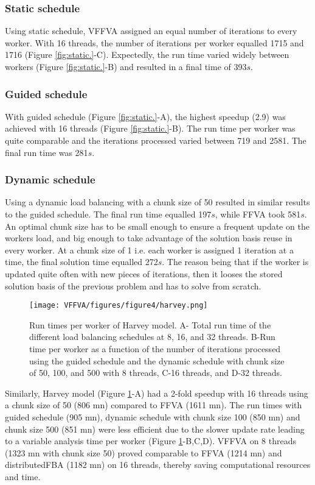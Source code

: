 \subsubsection{Static schedule}
Using static schedule, VFFVA assigned an equal number of iterations to every worker. With 16 threads, the number of iterations per worker equalled 1715 and 1716 (Figure \ref{fig:static.}-C). Expectedly, the run time varied widely between workers (Figure \ref{fig:static.}-B) and resulted in a final time of 393$s$.
\subsubsection{Guided schedule}
With guided schedule (Figure \ref{fig:static.}-A), the highest speedup (2.9) was achieved with 16 threads (Figure \ref{fig:static.}-B). The run time per worker was quite comparable and the iterations processed varied between 719 and 2581. The final run time was 281$s$.
\subsubsection{Dynamic schedule}
Using a dynamic load balancing with a chunk size of 50 resulted in similar results to the guided schedule. The final run time equalled 197$s$, while FFVA took 581$s$. An optimal chunk size has to be small enough to ensure a frequent update on the workers load, and big enough to take advantage of the solution basis reuse in every worker. At a chunk size of 1 i.e. each worker is assigned 1 iteration at a time, the final solution time equalled 272$s$. The reason being that if the worker is updated quite often with new pieces of iterations, then it looses the stored solution basis of the previous problem and has to solve from scratch.\\ 
\begin{figure}[!htp]
\centering
\texttt{[image: VFFVA/figures/figure4/harvey.png]}
\caption[Run times per worker of Harvey model.]{Run times per worker of Harvey model. A- Total run time of the different load balancing schedules at 8, 16, and 32 threads. B-Run time per worker as a function of the number of iterations processed using the guided schedule and the dynamic schedule with chunk size of 50, 100, and 500 with 8 threads, C-16 threads, and D-32 threads.}
\label{fig:harvey.}
\end{figure}
Similarly, Harvey model \cite{thiele2018metabolism} (Figure \ref{fig:harvey.}-A) had a 2-fold speedup with 16 threads using a chunk size of 50 (806 mn) compared to FFVA (1611 mn). The run times with guided schedule (905 mn), dynamic schedule with chunk size 100 (850 mn) and chunk size 500 (851 mn) were less efficient due to the slower update rate leading to a variable analysis time per worker (Figure \ref{fig:harvey.}-B,C,D). VFFVA on 8 threads (1323 mn with chunk size 50) proved comparable to FFVA (1214 mn) and distributedFBA (1182 mn) on 16 threads, thereby saving computational resources and time. 
